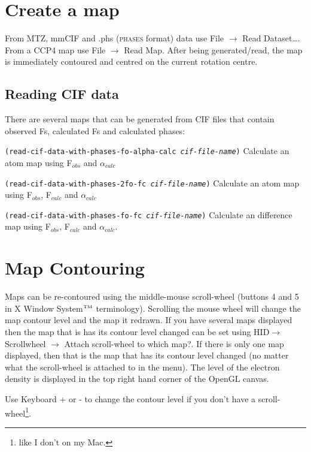 \documentclass{book}
\begin{document}
\section{Create a map}
From MTZ, mmCIF and .phs (\textsc{phases} format)
data use \textsf{File $\rightarrow$ Read Dataset\ldots}. From a CCP4
map use \textsf{File $\rightarrow$ Read Map}.  After being
generated/read, the map is immediately contoured and centred on the
current rotation centre.

\subsection{Reading CIF data}
There are several maps that can be generated from CIF files that
contain observed Fs, calculated Fs and calculated phases:

\begin{trivlist}
\item \texttt{(read-cif-data-with-phases-fo-alpha-calc
    \emph{cif-file-name})} Calculate an atom map using F$_{obs}$ and
  $\alpha_{calc}$
\item \texttt{(read-cif-data-with-phases-2fo-fc \emph{cif-file-name})}
 Calculate an atom map using F$_{obs}$, F$_{calc}$ and
  $\alpha_{calc}$
\item \texttt{(read-cif-data-with-phases-fo-fc \emph{cif-file-name})}
 Calculate an difference map using F$_{obs}$, F$_{calc}$ and
  $\alpha_{calc}$.
\end{trivlist}

\section{Map Contouring}
Maps can be re-contoured using the middle-mouse
scroll-wheel (buttons 4 and 5 in X Window System$^{\textrm{\tiny TM}}$
terminology).  Scrolling the mouse wheel will change the map contour
level and the map it redrawn.  If you have several maps displayed then
the map that is has its contour level changed can be set using
\textsf{HID$ \rightarrow$ Scrollwheel $\rightarrow$ Attach scroll-wheel
  to which map?}.  If there is only one map displayed, then that is
the map that has its contour level changed (no matter what the
scroll-wheel is attached to in the menu).  The level of the electron
density is displayed in the top right hand corner of the OpenGL canvas.

Use Keyboard + or - to change the contour level if you don't have a
scroll-wheel\footnote{like I don't on my Mac.}.
\end{document}

